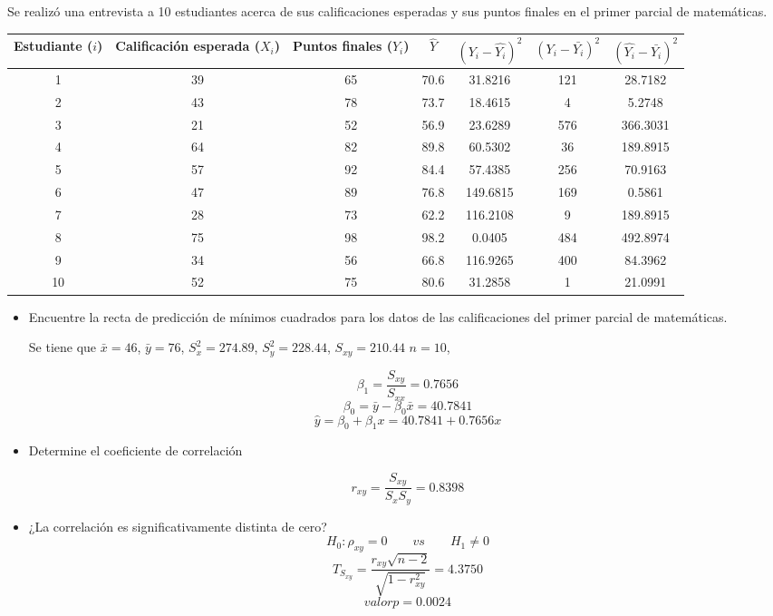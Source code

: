 \documentclass{../oxmathproblems}
\begin{document}
\begin{questions}


\miquestion Se realizó una entrevista a 10 estudiantes acerca de sus calificaciones  esperadas y sus puntos finales en el primer parcial de matemáticas. 

\begin{tabular}{|c|c|c|c|c|c|c|}
\hline
Estudiante ($i$) & Calificación esperada ($X_i$) & Puntos finales ($Y_i$) & $\hat{Y}$ & $(Y_i - \hat{Y_i})^2$ & $(Y_i - \bar{Y_i})^2$ & $(\hat{Y_i}-\bar{Y_i})^2$\\ \hline
1 & 39 & 65 & 70.6 & 31.8216 & 121 & 28.7182\\
2 & 43 & 78 & 73.7 & 18.4615 & 4 & 5.2748\\
3 & 21  & 52 & 56.9 & 23.6289 & 576 & 366.3031\\ 
4& 64 & 82 & 89.8 & 60.5302 & 36 & 189.8915\\ 
5 & 57 & 92 & 84.4 &  57.4385 & 256 & 70.9163\\ 
6 & 47 & 89 & 76.8 & 149.6815 & 169 & 0.5861\\ 
7 & 28 & 73 & 62.2 & 116.2108 & 9 & 189.8915\\
8 & 75 & 98 & 98.2 & 0.0405 & 484 & 492.8974\\ 
9 & 34 & 56 & 66.8 & 116.9265 & 400 & 84.3962\\ 
10 & 52 & 75 & 80.6 & 31.2858 & 1 & 21.0991\\ 
\hline
\end{tabular}

\begin{itemize}
\item Encuentre la recta de predicción de mínimos cuadrados para los datos de las calificaciones del primer parcial de matemáticas.

Se tiene que $\bar{x} = 46$, $ \bar{y} = 76$, $S_{x}^2 = 274.89$, $S_{y}^2 = 228.44$,  $S_{xy}=210.44$ $n = 10$,

$$ \beta_1 = \frac{S_{xy}}{S_{xx}} = 0.7656$$
$$ \beta_0 = \bar{y} - \beta_0 \bar{x} = 40.7841$$
$$ \hat{y} = \beta_0+\beta_1 x = 40.7841 + 0.7656x$$

\item Determine el coeficiente de correlación

$$ r_{xy} = \frac{S_{xy}}{S_{x} S_{y}} =  0.8398 $$

\item ¿La correlación es significativamente distinta de cero? 
$$H_0: \rho_{xy} = 0 \qquad vs \qquad H_1 \neq 0$$
$$T_{S_{xy}} = \frac{r_{xy}\sqrt{n-2}}{\sqrt{1-r_{xy}^2}} = 4.3750$$
$$valorp = 0.0024$$


\end{itemize}
\end{questions}
\end{document}
